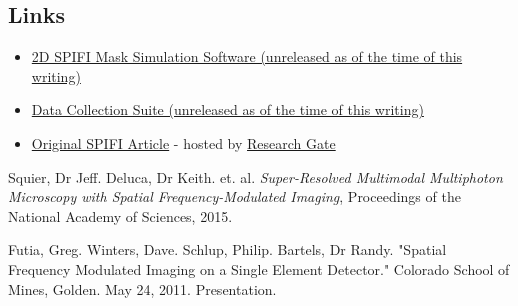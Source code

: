 \documentclass[12pt]{article}
\begin{document}
\subsection{Links}
\begin{itemize}
\item \href{https://gitlab.com/PiercingGaze/2DSimulator}{2D SPIFI Mask Simulation Software (unreleased as of the time of this writing)}
\item \href{https://gitlab.com/PiercingGaze/SPIFIDataCollectionSoftware}{Data Collection Suite (unreleased as of the time of this writing)}
\item \href{https://www.researchgate.net/profile/Alyssa_Allende_Motz/publication/281058706_Super-resolved_multimodal_multiphoton_microscopy_with_spatial_frequency-modulated_imaging/links/5790535d08ae64311c0c7dbb.pdf?origin=publication_detail&ev=pub_int_prw_xdl&msrp=c3fj9RD45iTpvk8bRBlzYkN6ndcAYlW9SDWsP0gVb8WzFV5pplCJ3WT6D9fQrP2OT3rGfRWxpWECBz07rTxtH3ZWQ-V2CIIn99KlfPF-otY.9HgCklW2b18-KeSg_Y6vX11zOug1uQ3SSCEpbGXSzk5y_fIuZAdBHJtjk82L1NpfpV2e2Cvcd6QBkqBT24bFzQ.uEqPWNYXdN8Ge_jgkDmRdTlNB8rMwiFPPFdueuZQ9VY6c_KOsp-YvgMVBaNkL6Ldag5ifDVuL2YqcNGnICTcHA}{Original SPIFI Article} - hosted by
\href{https://www.researchgate.net}{Research Gate}
\end{itemize}
\newpage
\begin{thebibliography}{9}

  Squier, Dr Jeff. Deluca, Dr Keith. et. al.
  \emph{Super-Resolved Multimodal Multiphoton Microscopy with Spatial Frequency-Modulated
Imaging},
  Proceedings of the National Academy of Sciences,
  2015.
  
  Futia, Greg. Winters, Dave. Schlup, Philip. Bartels, Dr Randy.
  "Spatial Frequency Modulated Imaging on a Single Element Detector."
  Colorado School of Mines, Golden. May 24, 2011. Presentation.
  

\end{thebibliography}
\end{document}
